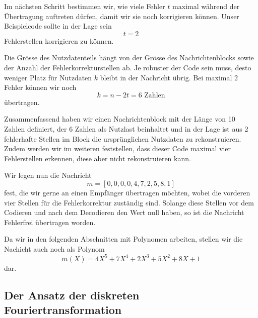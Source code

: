 
Im nächsten Schritt bestimmen wir, wie viele Fehler $t$ maximal während der Übertragung auftreten dürfen, damit wir sie noch korrigieren können.
Unser Beispielcode sollte in der Lage sein
\[
t = 2
\]
Fehlerstellen korrigieren zu können.

Die Grösse des Nutzdatenteils hängt von der Grösse des Nachrichtenblocks sowie der Anzahl der Fehlerkorrekturstellen ab. Je robuster der Code sein muss, desto weniger Platz für Nutzdaten $k$ bleibt in der Nachricht übrig.
Bei maximal 2 Fehler können wir noch
\[
k = n - 2t = 6\text{ Zahlen}
\]
übertragen. 

Zusammenfassend haben wir einen Nachrichtenblock mit der Länge von 10 Zahlen definiert, der 6 Zahlen als Nutzlast beinhaltet und in der Lage ist aus 2 fehlerhafte Stellen im Block die ursprünglichen Nutzdaten zu rekonstruieren. Zudem werden wir im weiteren feststellen, dass dieser Code maximal vier Fehlerstellen erkennen, diese aber nicht rekonstruieren kann.

Wir legen nun die Nachricht
\[
m = [0,0,0,0,4,7,2,5,8,1]
\]
fest, die wir gerne an einen Empfänger übertragen möchten, wobei die vorderen vier Stellen für die Fehlerkorrektur zuständig sind.
Solange diese Stellen vor dem Codieren und nach dem Decodieren den Wert null haben, so ist die Nachricht Fehlerfrei übertragen worden.

Da wir in den folgenden Abschnitten mit Polynomen arbeiten, stellen wir die Nachicht auch noch als Polynom
\[
m(X) = 4X^5 + 7X^4 + 2X^3 + 5X^2 + 8X + 1
\] 
dar.


\subsection{Der Ansatz der diskreten Fouriertransformation
	\label{reedsolomon:subsection:diskFT}}

